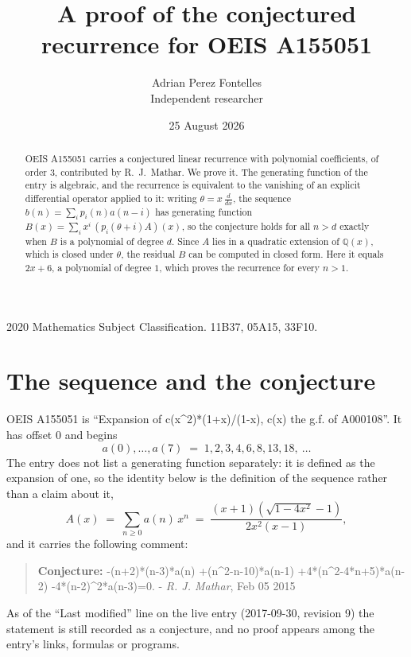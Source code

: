 \documentclass[11pt,a4paper]{article}
\title{A proof of the conjectured recurrence for OEIS A155051}
\author{Adrian Perez Fontelles\\ \small Independent researcher}
\date{25 August 2026}
\theoremstyle{plain}
\theoremstyle{definition}
\begin{document}
\maketitle

\begin{abstract}
OEIS A155051 carries a conjectured linear recurrence with polynomial coefficients, of
order 3, contributed by R.~J.~Mathar. We prove it. The generating function of the
entry is algebraic, and the recurrence is equivalent to the vanishing of an explicit
differential operator applied to it: writing $\theta=x\,\frac{d}{dx}$, the sequence
$b(n)=\sum_{i}p_{i}(n)a(n-i)$ has generating function
$B(x)=\sum_{i}x^{i}\,(p_{i}(\theta+i)A)(x)$, so the conjecture holds for all $n>d$ exactly
when $B$ is a polynomial of degree $d$. Since $A$ lies in a quadratic extension of
$\mathbb{Q}(x)$, which is closed under $\theta$, the residual $B$ can be computed in
closed form. Here it equals $2 x + 6$, a polynomial of degree $1$, which proves
the recurrence for every $n>1$.
\end{abstract}

\noindent\small 2020 Mathematics Subject Classification. 11B37, 05A15, 33F10.\normalsize

\section{The sequence and the conjecture}

OEIS A155051 is ``Expansion of c(x\^{}2)*(1+x)/(1-x), c(x) the g.f. of A000108''. It has offset $0$ and begins
\[
a(0),\dots,a(7)\;=\;1, 2, 3, 4, 6, 8, 13, 18,\ \dots
\]
The entry does not list a generating function separately: it is defined as the
expansion of one, so the identity below is the definition of the sequence rather than a
claim about it,
\begin{equation}\label{eq:gf}
A(x)\;=\;\sum_{n\ge 0} a(n)\,x^{n}\;=\;\frac{\left(x + 1\right) \left(\sqrt{1 - 4 x^{2}} - 1\right)}{2 x^{2} \left(x - 1\right)} ,
\end{equation}
and it carries the following comment:
\begin{quote}\small
\textbf{Conjecture:} -(n+2)*(n-3)*a(n) +(n\^{}2-n-10)*a(n-1) +4*(n\^{}2-4*n+5)*a(n-2) -4*(n-2)\^{}2*a(n-3)=0. - \emph{R. J. Mathar}, Feb 05 2015
\end{quote}
As of the ``Last modified'' line on the live entry (2017-09-30, revision 9) the
statement is still recorded as a conjecture, and no proof appears among the entry's links,
formulas or programs.
\end{document}
